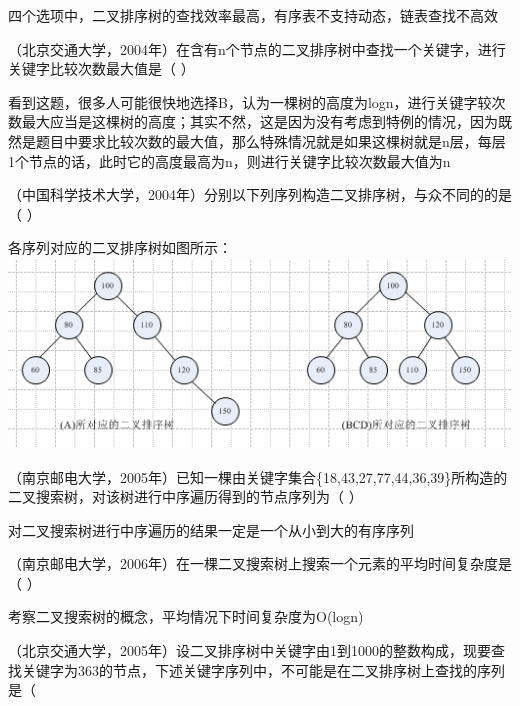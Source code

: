\begin{solution}四个选项中，二叉排序树的查找效率最高，有序表不支持动态，链表查找不高效
\end{solution}
\question （北京交通大学，2004年）在含有n个节点的二叉排序树中查找一个关键字，进行关键字比较次数最大值是（
）
\par{}
\begin{solution}看到这题，很多人可能很快地选择B，认为一棵树的高度为logn，进行关键字较次数最大应当是这棵树的高度；其实不然，这是因为没有考虑到特例的情况，因为既然是题目中要求比较次数的最大值，那么特殊情况就是如果这棵树就是n层，每层1个节点的话，此时它的高度最高为n，则进行关键字比较次数最大值为n
\end{solution}
\question （中国科学技术大学，2004年）分别以下列序列构造二叉排序树，与众不同的的是（
）
\par{}
\begin{solution}各序列对应的二叉排序树如图所示：
\includegraphics[width=5.37500in,height=1.98958in]{computerassets/e35aeff3fcf8b84414a7eac48edcb852.png}
\end{solution}
\question （南京邮电大学，2005年）已知一棵由关键字集合\{18,43,27,77,44,36,39\}所构造的二叉搜索树，对该树进行中序遍历得到的节点序列为（
）
\par{}
\begin{solution}对二叉搜索树进行中序遍历的结果一定是一个从小到大的有序序列
\end{solution}
\question （南京邮电大学，2006年）在一棵二叉搜索树上搜索一个元素的平均时间复杂度是（
）
\par{}
\begin{solution}考察二叉搜索树的概念，平均情况下时间复杂度为O(logn)
\end{solution}
\question （北京交通大学，2005年）设二叉排序树中关键字由1到1000的整数构成，现要查找关键字为363的节点，下述关键字序列中，不可能是在二叉排序树上查找的序列是（
